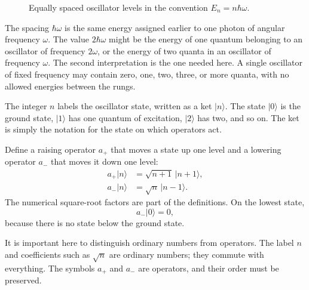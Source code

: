 \begin{figure}[t]
\centering
{}
\caption{Equally spaced oscillator levels in the convention \(E_n=n\hbar\omega\).}
\end{figure}

The spacing \(\hbar\omega\) is the same energy assigned earlier to one photon of angular frequency \(\omega\). The value \(2\hbar\omega\) might be the energy of one quantum belonging to an oscillator of frequency \(2\omega\), or the energy of two quanta in an oscillator of frequency \(\omega\). The second interpretation is the one needed here. A single oscillator of fixed frequency may contain zero, one, two, three, or more quanta, with no allowed energies between the rungs.

The integer \(n\) labels the oscillator state, written as a ket \(|n\rangle\). The state \(|0\rangle\) is the ground state, \(|1\rangle\) has one quantum of excitation, \(|2\rangle\) has two, and so on. The ket is simply the notation for the state on which operators act.

Define a raising operator \(a_+\) that moves a state up one level and a lowering operator \(a_-\) that moves it down one level:
\begin{align}
a_+|n\rangle &= \sqrt{n+1}\,|n+1\rangle,\\
a_-|n\rangle &= \sqrt{n}\,|n-1\rangle.
\end{align}
The numerical square-root factors are part of the definitions. On the lowest state,
\begin{equation}
a_-|0\rangle=0,
\end{equation}
because there is no state below the ground state.

It is important here to distinguish ordinary numbers from operators. The label \(n\) and coefficients such as \(\sqrt n\) are ordinary numbers; they commute with everything. The symbols \(a_+\) and \(a_-\) are operators, and their order must be preserved.

